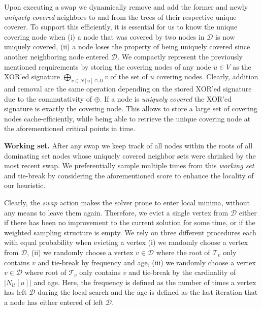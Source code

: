\documentclass[a4paper, USenglish, cleveref, autoref, thm-restate, noalgorithm2e]{socg-lipics-v2021}
\newcommand{\domset}{\ensuremath{\mathcal D}\xspace}
\newcommand{\uniquelycovered}{\ensuremath{\mathcal U}\xspace}
\newcommand{\intersectiontree}{\ensuremath{\mathcal T}\xspace}
\begin{document}
%
Upon executing a swap we dynamically remove and add the former and newly \textit{uniquely covered} neighbors to and from the trees of their respective unique coverer.
%
To support this efficiently, it is essential for us to know the unique covering node when (i) a node that was covered by two nodes in $\domset$ is now uniquely covered, (ii) a node loses the property of being uniquely covered since another neighboring node entered $\domset$.
%
We compactly represent the previously mentioned requirements by storing the covering nodes of any node $u \in V$ as the XOR'ed signature $\bigoplus_{v \in N[u]\cap D} v$ of the set of $u$ covering nodes.
%
Clearly, addition and removal are the same operation depending on the stored XOR'ed signature due to the commutativity of $\oplus$.
%
If a node is \textit{uniquely covered} the XOR'ed signature is exactly the covering node.
%
This allows to store a large set of covering nodes cache-efficiently, while being able to retrieve the unique covering node at the aforementioned critical points in time. 

\textbf{Working set.} After any swap we keep track of all nodes within the roots of all dominating set nodes whose uniquely covered neighbor sets were shrinked by the most recent swap.
%
We preferentially sample multiple times from this \textit{working set} and tie-break by considering the aforementioned score to enhance the locality of our heuristic.

Clearly, the \textit{swap} action makes the solver prone to enter local minima, without any means to leave them again.
%
Therefore, we evict a single vertex from $\domset$ either if there has been no improvement to the current solution for some time, or if the weighted sampling structure is empty.
%
We rely on three different procedures each with equal probability when evicting a vertex (i) we randomly choose a vertex from $\domset$, (ii) we randomly choose a vertex $v \in \domset$ where the root of $\intersectiontree_v$ only contains $v$ and tie-break by frequency and age, (iii) we randomly choose a vertex $v \in \domset$ where root of $\intersectiontree_v$ only contains $v$ and tie-break by the cardinality of $|N_{\uniquelycovered}[u]|$ and age.
%
Here, the frequency is defined as the number of times a vertex has left $\domset$ during the local search and the age is defined as the last iteration that a node has either entered of left $\domset$.   




\end{document}
